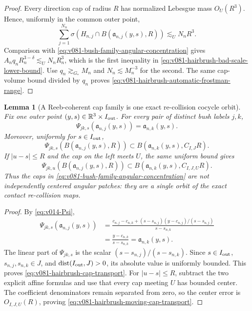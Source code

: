 \documentclass[10pt]{article}
\newtheorem{lemma}[theorem]{Lemma}
\newcommand{\dist}{\operatorname{dist}}
\begin{document}
\begin{proof}
Every direction cap of radius \(R\) has normalized Lebesgue mass \(O_U(R^3)\).  Hence, uniformly in
the common outer point,
\[
\sum_{j=1}^{N_n}
\sigma\!\left(H_{n,j}\cap B(\mathfrak a_{n,j}(y,s),R)\right)
\lesssim_U N_nR^3.
\]
Comparison with \eqref{eq:v081-bush-family-angular-concentration} gives
\(A_nq_nR_n^{3-\delta}\lesssim_UN_nR_n^3\), which is the first inequality in
\eqref{eq:v081-hairbrush-bad-scale-lower-bound}.  Use
\(q_n\gtrsim_{G_*}M_n\) and \(N_n\lesssim M_n^{-3}\) for the second.  The same cap-volume bound
divided by \(q_n\) proves
\eqref{eq:v081-hairbrush-automatic-frostman-range}.
\end{proof}

\begin{lemma}[A Reeb-coherent cap family is one exact re-collision cocycle orbit]
\label{lem:v081-hairbrush-recollision-cocycle}
Fix one outer point \((y,s)\in\mathbb R^3\times I_{\rm out}\).  For every pair of distinct bush labels
\(j,k\),
\begin{equation}
\label{eq:v081-hairbrush-center-transport}
\boxed{
\Psi_{jk,s}\!\left(\mathfrak a_{n,j}(y,s)\right)
=
\mathfrak a_{n,k}(y,s).
}
\end{equation}
Moreover, uniformly for \(s\in I_{\rm out}\),
\begin{equation}
\label{eq:v081-hairbrush-cap-transport}
\Psi_{jk,s}\!\left(
B(\mathfrak a_{n,j}(y,s),R)
\right)
\subset
B(\mathfrak a_{n,k}(y,s),C_{I,J}R).
\end{equation}
If \(|u-s|\le R\) and the cap on the left meets \(U\), the same uniform bound gives
\begin{equation}
\label{eq:v081-hairbrush-moving-cap-transport}
\Psi_{jk,u}\!\left(
B(\mathfrak a_{n,j}(y,s),R)
\right)
\subset
B(\mathfrak a_{n,k}(y,s),C_{I,J,U}R).
\end{equation}
Thus the caps in
\eqref{eq:v081-bush-family-angular-concentration} are not independently centered angular
patches: they are a single orbit of the exact contact re-collision maps.
\end{lemma}

\begin{proof}
By \eqref{eq:v014-Psi},
\[
\begin{aligned}
\Psi_{jk,s}\!\left(\mathfrak a_{n,j}(y,s)\right)
&=
\frac{c_{n,j}-c_{n,k}+(s-s_{n,j})(y-c_{n,j})/(s-s_{n,j})}
{s-s_{n,k}}\\
&=
\frac{y-c_{n,k}}{s-s_{n,k}}
=
\mathfrak a_{n,k}(y,s).
\end{aligned}
\]
The linear part of \(\Psi_{jk,s}\) is the scalar
\((s-s_{n,j})/(s-s_{n,k})\).  Since \(s\in I_{\rm out}\),
\(s_{n,j},s_{n,k}\in J\), and \(\dist(I_{\rm out},J)>0\), its absolute value is uniformly
bounded.  This proves \eqref{eq:v081-hairbrush-cap-transport}.
For \(|u-s|\le R\), subtract the two explicit affine formulas and use that every cap meeting
\(U\) has bounded center.  The coefficient denominators remain separated from zero, so the center
error is \(O_{I,J,U}(R)\), proving
\eqref{eq:v081-hairbrush-moving-cap-transport}.
\end{proof}
\end{document}
